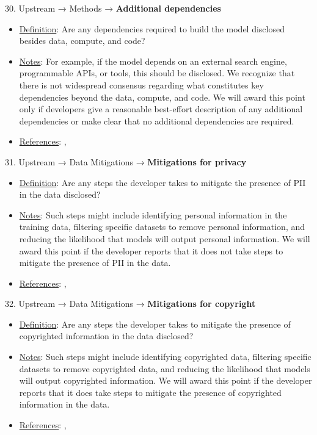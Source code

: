 30. Upstream → Methods → \textbf{Additional dependencies}
\vspace{-\parskip}
\begin{itemize}
\item
\underline{Definition}: Are any dependencies required to build the model disclosed besides data, compute, and code?
\item
\underline{Notes}: For example, if the model depends on an external search engine, programmable APIs, or tools, this should be disclosed. We recognize that there is not widespread consensus regarding what constitutes key dependencies beyond the data, compute, and code. We will award this point only if developers give a reasonable best-effort description of any additional dependencies or make clear that no additional dependencies are required.
\item
\underline{References}: \citet{lukas2023analyzing}, \citet{kim2023propile}
\end{itemize} \vspace{\baselineskip}


31. Upstream → Data Mitigations → \textbf{Mitigations for privacy}
\vspace{-\parskip}
\begin{itemize}
\item
\underline{Definition}: Are any steps the developer takes to mitigate the presence of PII in the data disclosed?
\item
\underline{Notes}: Such steps might include identifying personal information in the training data, filtering specific datasets to remove personal information, and reducing the likelihood that models will output personal information. We will award this point if the developer reports that it does not take steps to mitigate the presence of PII in the data.
\item
\underline{References}: \citet{kandpal2022deduplicating}, \citet{genlaw2023}
\end{itemize} \vspace{\baselineskip}


32. Upstream → Data Mitigations → \textbf{Mitigations for copyright}
\vspace{-\parskip}
\begin{itemize}
\item
\underline{Definition}: Are any steps the developer takes to mitigate the presence of copyrighted information in the data disclosed?
\item
\underline{Notes}: Such steps might include identifying copyrighted data, filtering specific datasets to remove copyrighted data, and reducing the likelihood that models will output copyrighted information. We will award this point if the developer reports that it does take steps to mitigate the presence of copyrighted information in the data.
\item
\underline{References}: \citet{bandy2021addressing}, \citet{genlaw2023}
\end{itemize} \vspace{\baselineskip}


